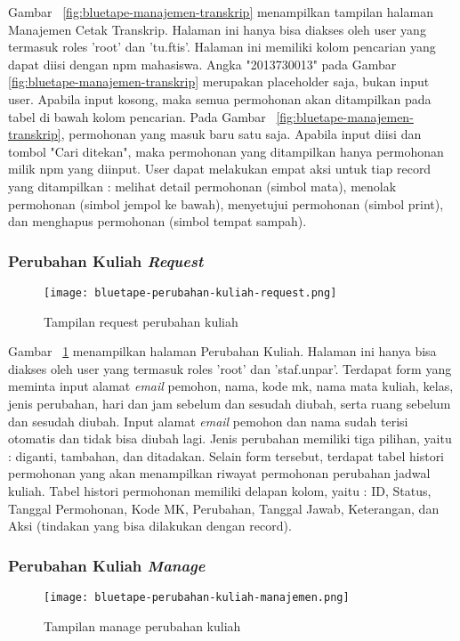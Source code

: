 	Gambar~ \ref{fig:bluetape-manajemen-transkrip} menampilkan tampilan halaman Manajemen Cetak Transkrip. Halaman ini hanya bisa diakses oleh user yang termasuk roles 'root' dan 'tu.ftis'. Halaman ini memiliki kolom pencarian yang dapat diisi dengan npm mahasiswa. Angka "2013730013" pada Gambar~ \ref{fig:bluetape-manajemen-transkrip} merupakan placeholder saja, bukan input user. Apabila input kosong, maka semua permohonan akan ditampilkan pada tabel di bawah kolom pencarian. Pada Gambar~ \ref{fig:bluetape-manajemen-transkrip}, permohonan yang masuk baru satu saja. Apabila input diisi dan tombol "Cari ditekan", maka permohonan yang ditampilkan hanya permohonan milik npm yang diinput. User dapat melakukan empat aksi untuk tiap record yang ditampilkan : melihat detail permohonan (simbol mata), menolak permohonan (simbol jempol ke bawah), menyetujui permohonan (simbol print), dan menghapus permohonan (simbol tempat sampah).
	
	\subsubsection{Perubahan Kuliah \textit{Request}}
	\begin{figure}[H]
		\centering  
		\texttt{[image: bluetape-perubahan-kuliah-request.png]}  
		\caption[Tampilan request perubahan kuliah]{Tampilan request perubahan kuliah} 
		\label{fig:bluetape-perubahan-kuliah-request} 
	\end{figure}
	
	Gambar~ \ref{fig:bluetape-perubahan-kuliah-request} menampilkan halaman Perubahan Kuliah. Halaman ini hanya bisa diakses oleh user yang termasuk roles 'root' dan 'staf.unpar'. Terdapat form yang meminta input alamat \textit{email} pemohon, nama, kode mk, nama mata kuliah, kelas, jenis perubahan, hari dan jam sebelum dan sesudah diubah, serta ruang sebelum dan sesudah diubah. Input alamat \textit{email} pemohon dan nama sudah terisi otomatis dan tidak bisa diubah lagi. Jenis perubahan memiliki tiga pilihan, yaitu : diganti, tambahan, dan ditadakan. Selain form tersebut, terdapat tabel histori permohonan yang akan menampilkan riwayat permohonan perubahan jadwal kuliah. Tabel histori permohonan memiliki delapan kolom, yaitu : ID, Status, Tanggal Permohonan, Kode MK, Perubahan, Tanggal Jawab, Keterangan, dan Aksi (tindakan yang bisa dilakukan dengan record).
	
	\subsubsection{Perubahan Kuliah \textit{Manage}}
	\begin{figure}[H]
		\centering  
		\texttt{[image: bluetape-perubahan-kuliah-manajemen.png]}  
		\caption[Tampilan manage perubahan kuliah]{Tampilan manage perubahan kuliah} 
		\label{fig:bluetape-perubahan-kuliah-manajemen} 
	\end{figure}
	
